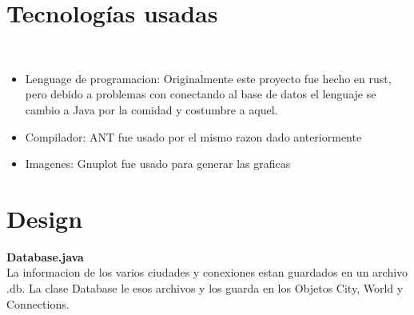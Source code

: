 \documentclass{article}
\begin{document}
    \section{Tecnologías usadas}\\
    \begin{itemize}
        \item {Lenguage de programacion: Originalmente este proyecto fue hecho en rust, pero debido a problemas con conectando al base de datos el lenguaje se cambio a Java por la comidad y costumbre a aquel.}
        \item{Compilador: ANT fue usado por el mismo razon dado anteriormente}
        \item{Imagenes: Gnuplot fue usado para generar las graficas}
    \end{itemize}

   
   
    \section{Design}
    
    \textbf{Database.java} \\
    La informacion de los varios ciudades y conexiones estan guardados en un archivo .db. La clase Database
    le esos archivos y los guarda en los Objetos City, World y Connections. \\
    
\end{document}
